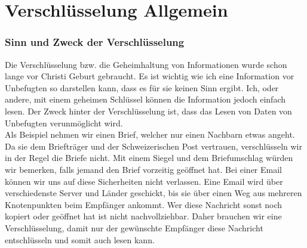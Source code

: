 \part{Verschlüsselung Allgemein}
\section{Sinn und Zweck der Verschlüsselung}
Die Verschlüsselung bzw. die Geheimhaltung von Informationen wurde schon lange vor Christi Geburt gebraucht. Es ist wichtig wie ich eine Information vor Unbefugten so darstellen kann, dass es für sie keinen Sinn ergibt. Ich, oder andere, mit einem geheimen Schlüssel können die Information jedoch einfach lesen. Der Zweck hinter der Verschlüsselung ist, dass das Lesen von Daten von Unbefugten verunmöglicht wird. \\
Als Beispiel nehmen wir einen Brief, welcher nur einen Nachbarn etwas angeht. Da sie dem Briefträger und der Schweizerischen Post vertrauen, verschlüsseln wir in der Regel die Briefe nicht. Mit einem Siegel und dem Briefumschlag würden wir bemerken, falls jemand den Brief vorzeitig geöffnet hat. Bei einer Email können wir uns auf diese Sicherheiten nicht verlassen. Eine Email wird über verschiedenste Server und Länder geschickt, bis sie über einen Weg aus mehreren Knotenpunkten beim Empfänger ankommt. Wer diese Nachricht sonst noch kopiert oder geöffnet hat ist nicht nachvollziehbar. Daher brauchen wir eine Verschlüsselung, damit nur der gewünschte Empfänger diese Nachricht entschlüsseln und somit auch lesen kann.


%
